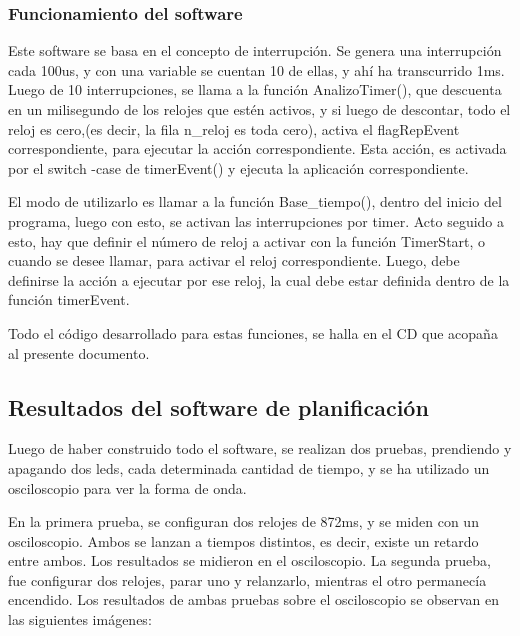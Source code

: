 \subsubsection{Funcionamiento del software} 

Este software se basa en el concepto de interrupción. Se genera una interrupción cada 100us, y con una variable se cuentan 10 de ellas, y ahí ha transcurrido 1ms. Luego de 10 interrupciones, se llama a la función AnalizoTimer(), que descuenta en un milisegundo de los relojes que estén activos, y si luego de descontar, todo el reloj es cero,(es decir, la fila n\_reloj es toda cero), activa el flagRepEvent correspondiente, para ejecutar la acción correspondiente. Esta acción, es activada por el switch -case de timerEvent() y ejecuta la aplicación correspondiente. 

El modo de utilizarlo es llamar a la función Base\_tiempo(), dentro del inicio del programa, luego con esto, se activan las interrupciones por timer. Acto seguido a esto, hay que definir el número de reloj a activar con la función TimerStart, o cuando se desee llamar, para activar el reloj correspondiente. Luego, debe definirse la acción a ejecutar por ese reloj, la cual debe estar definida dentro de la función timerEvent. 

Todo el código desarrollado para estas funciones, se halla en el CD que acopaña al presente documento.



\subsection{Resultados del software de planificación}

Luego de haber construido todo el software, se realizan dos pruebas, prendiendo y apagando dos leds, cada determinada cantidad de tiempo, y se ha utilizado un osciloscopio para ver la forma de onda.
 
En la primera prueba, se configuran dos relojes de 872ms, y se miden con un osciloscopio. Ambos se lanzan a tiempos distintos, es decir, existe un retardo entre ambos. Los resultados se midieron en el osciloscopio. La segunda prueba, fue configurar dos relojes, parar uno y relanzarlo, mientras el otro permanecía encendido. Los resultados de ambas pruebas sobre el osciloscopio se observan en las siguientes imágenes: 


